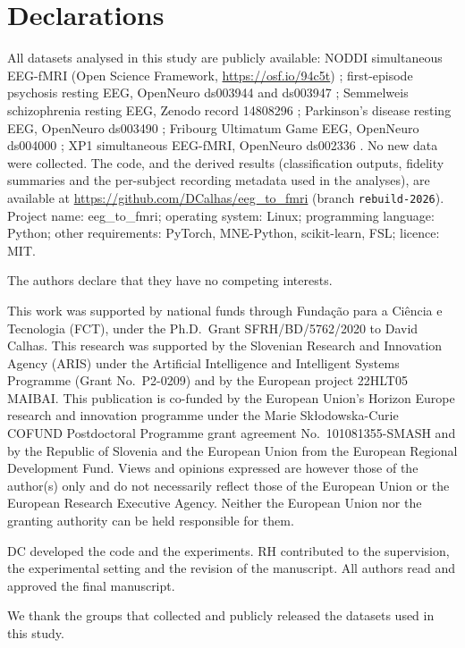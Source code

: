 \documentclass[pdflatex,referee,sn-basic]{sn-jnl}%
\begin{document}
\section*{Declarations}

All datasets analysed in this study are publicly available: NODDI simultaneous EEG-fMRI (Open Science Framework, \url{https://osf.io/94c5t}) \cite{dataset_01}; first-episode psychosis resting EEG, OpenNeuro ds003944 and ds003947 \cite{salisbury_ds003944,salisbury_ds003947}; Semmelweis schizophrenia resting EEG, Zenodo record 14808296 \cite{racz2025}; Parkinson's disease resting EEG, OpenNeuro ds003490 \cite{cavanagh_ds003490}; Fribourg Ultimatum Game EEG, OpenNeuro ds004000 \cite{dataset2022fribourg}; XP1 simultaneous EEG-fMRI, OpenNeuro ds002336 \cite{lioi2020xp}. No new data were collected. The code, and the derived results (classification outputs, fidelity summaries and the per-subject recording metadata used in the analyses), are available at \url{https://github.com/DCalhas/eeg_to_fmri} (branch \texttt{rebuild-2026}). Project name: eeg\_to\_fmri; operating system: Linux; programming language: Python; other requirements: PyTorch, MNE-Python, scikit-learn, FSL; licence: MIT.

The authors declare that they have no competing interests.

This work was supported by national funds through Funda\c{c}\~{a}o para a Ci\^{e}ncia e Tecnologia (FCT), under the Ph.D.\ Grant SFRH/BD/5762/2020 to David Calhas. This research was supported by the Slovenian Research and Innovation Agency (ARIS) under the Artificial Intelligence and Intelligent Systems Programme (Grant No.~P2-0209) and by the European project 22HLT05 MAIBAI. This publication is co-funded by the European Union's Horizon Europe research and innovation programme under the Marie Sk{\l}odowska-Curie COFUND Postdoctoral Programme grant agreement No.~101081355-SMASH and by the Republic of Slovenia and the European Union from the European Regional Development Fund. Views and opinions expressed are however those of the author(s) only and do not necessarily reflect those of the European Union or the European Research Executive Agency. Neither the European Union nor the granting authority can be held responsible for them.

DC developed the code and the experiments. RH contributed to the supervision, the experimental setting and the revision of the manuscript. All authors read and approved the final manuscript.

We thank the groups that collected and publicly released the datasets used in this study.


\end{document}
